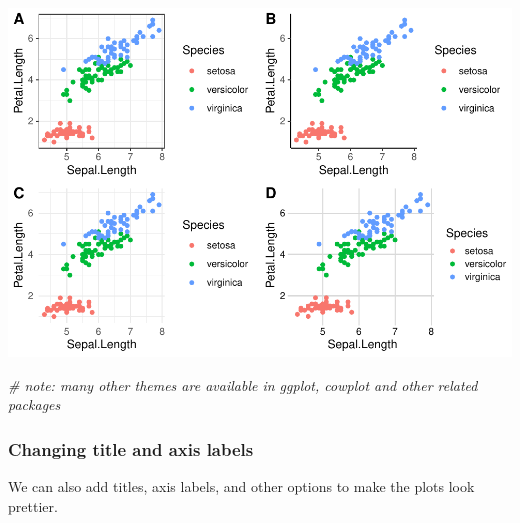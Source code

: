 \documentclass[
]{article}
\newenvironment{Shaded}{\begin{snugshade}}{\end{snugshade}}
\newcommand{\CommentTok}[1]{\textcolor[rgb]{0.56,0.35,0.01}{\textit{#1}}}
\begin{document}
\includegraphics{module1_3_files/figure-latex/unnamed-chunk-12-1.pdf}

\begin{Shaded}
\begin{Highlighting}[]
\CommentTok{\# note: many other themes are available in ggplot, cowplot and other related packages}
\end{Highlighting}
\end{Shaded}

\hypertarget{changing-title-and-axis-labels}{%
\subsubsection{Changing title and axis
labels}\label{changing-title-and-axis-labels}}

We can also add titles, axis labels, and other options to make the plots
look prettier.
\end{document}
